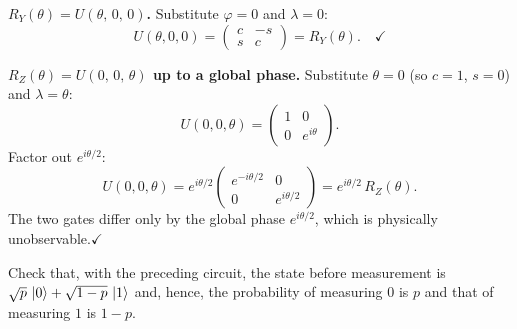 \documentclass{ceri/sty/rapport}
\newcounter{exercice}[section]
\begin{document}
\begin{solution}
\medskip\noindent
\textbf{$R_Y(\theta) = U(\theta,\,0,\,0)$.}
Substitute $\varphi=0$ and $\lambda=0$:
\[
  U(\theta,0,0)
  = \begin{pmatrix}c & -s\\s & c\end{pmatrix}
  = R_Y(\theta).\quad\checkmark
\]

\medskip\noindent
\textbf{$R_Z(\theta) = U(0,\,0,\,\theta)$ up to a global phase.}
Substitute $\theta=0$ (so $c=1$, $s=0$) and $\lambda=\theta$:
\[
  U(0,0,\theta)
  = \begin{pmatrix}1 & 0\\0 & e^{i\theta}\end{pmatrix}.
\]
Factor out $e^{i\theta/2}$:
\[
  U(0,0,\theta)
  = e^{i\theta/2}
    \begin{pmatrix}e^{-i\theta/2} & 0\\0 & e^{i\theta/2}\end{pmatrix}
  = e^{i\theta/2}\,R_Z(\theta).
\]
The two gates differ only by the global phase $e^{i\theta/2}$, which is
physically unobservable.\quad$\checkmark$
\end{solution}

\begin{exercice}[p.~23]
Check that, with the preceding circuit, the state before measurement is
$\sqrt{p}\,\ket{0} + \sqrt{1-p}\,\ket{1}$ and, hence, the probability of
measuring $0$ is $p$ and that of measuring $1$ is $1-p$.
\end{exercice}
\end{document}
